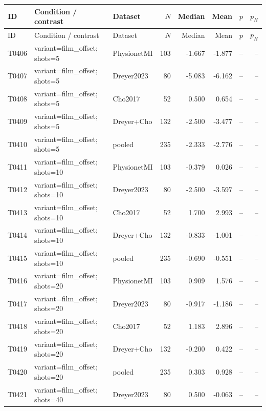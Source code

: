 \begin{longtable}{p{.45in}p{2.6in}p{.75in}rrrrr}
\toprule
ID & Condition / contrast & Dataset & $N$ & Median & Mean & $p$ & $p_H$ \\
\midrule
\endfirsthead
\toprule
ID & Condition / contrast & Dataset & $N$ & Median & Mean & $p$ & $p_H$ \\
\midrule
\endhead
T0406 & variant=film\_\allowbreak{}offset; shots=5 & PhysionetMI & 103 & -1.667 & -1.877 & -- & -- \\
T0407 & variant=film\_\allowbreak{}offset; shots=5 & Dreyer2023 & 80 & -5.083 & -6.162 & -- & -- \\
T0408 & variant=film\_\allowbreak{}offset; shots=5 & Cho2017 & 52 & 0.500 & 0.654 & -- & -- \\
T0409 & variant=film\_\allowbreak{}offset; shots=5 & Dreyer+Cho & 132 & -2.500 & -3.477 & -- & -- \\
T0410 & variant=film\_\allowbreak{}offset; shots=5 & pooled & 235 & -2.333 & -2.776 & -- & -- \\
T0411 & variant=film\_\allowbreak{}offset; shots=10 & PhysionetMI & 103 & -0.379 & 0.026 & -- & -- \\
T0412 & variant=film\_\allowbreak{}offset; shots=10 & Dreyer2023 & 80 & -2.500 & -3.597 & -- & -- \\
T0413 & variant=film\_\allowbreak{}offset; shots=10 & Cho2017 & 52 & 1.700 & 2.993 & -- & -- \\
T0414 & variant=film\_\allowbreak{}offset; shots=10 & Dreyer+Cho & 132 & -0.833 & -1.001 & -- & -- \\
T0415 & variant=film\_\allowbreak{}offset; shots=10 & pooled & 235 & -0.690 & -0.551 & -- & -- \\
T0416 & variant=film\_\allowbreak{}offset; shots=20 & PhysionetMI & 103 & 0.909 & 1.576 & -- & -- \\
T0417 & variant=film\_\allowbreak{}offset; shots=20 & Dreyer2023 & 80 & -0.917 & -1.186 & -- & -- \\
T0418 & variant=film\_\allowbreak{}offset; shots=20 & Cho2017 & 52 & 1.183 & 2.896 & -- & -- \\
T0419 & variant=film\_\allowbreak{}offset; shots=20 & Dreyer+Cho & 132 & -0.200 & 0.422 & -- & -- \\
T0420 & variant=film\_\allowbreak{}offset; shots=20 & pooled & 235 & 0.303 & 0.928 & -- & -- \\
T0421 & variant=film\_\allowbreak{}offset; shots=40 & Dreyer2023 & 80 & 0.500 & -0.063 & -- & -- \\

\end{longtable}
